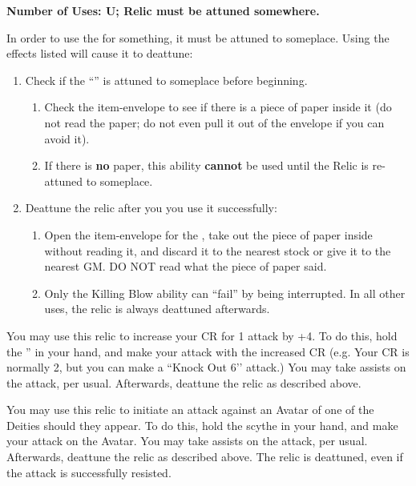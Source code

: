 \documentclass[green]{GL2020}
\begin{document}
\name{\gDeathRelic{}}

\textbf{Number of Uses: U; Relic must be attuned somewhere.}

In order to use the \iScythe{} for something, it must be attuned to someplace. Using the effects listed will cause it to deattune:
\begin{enumerate}
  \item Check if the ``\iScythe{}'' is attuned to someplace before beginning.
  \begin{enumerate}
    \item Check the item-envelope to see if there is a piece of paper inside it (do not read the paper; do not even pull it out of the envelope if you can avoid it).
    \item If there is \textbf{no} paper, this ability \textbf{cannot} be used until the Relic is re-attuned to someplace.
  \end{enumerate}
  \item Deattune the relic after you you use it successfully:
  \begin{enumerate}
    \item Open the item-envelope for the \iScythe{}, take out the piece of paper inside without reading it, and discard it to the nearest stock or give it to the nearest GM. DO NOT read what the piece of paper said.
    \item Only the Killing Blow ability can ``fail'' by being interrupted. In all other uses, the relic is always deattuned afterwards.
    \end{enumerate}
\end{enumerate}

You may use this relic to increase your CR for 1 attack by +4. To do this, hold the \iScythe{}'' in your hand, and make your attack with the increased CR (e.g. Your CR is normally 2, but you can make a ``Knock Out 6’’ attack.) You may take assists on the attack, per usual. Afterwards, deattune the relic as described above.

You may use this relic to initiate an attack against an Avatar of one of the Deities should they appear. To do this, hold the scythe in your hand, and make your attack on the Avatar. You may take assists on the attack, per usual. Afterwards, deattune the relic as described above. The relic is deattuned, even if the attack is successfully resisted.
\end{document}
